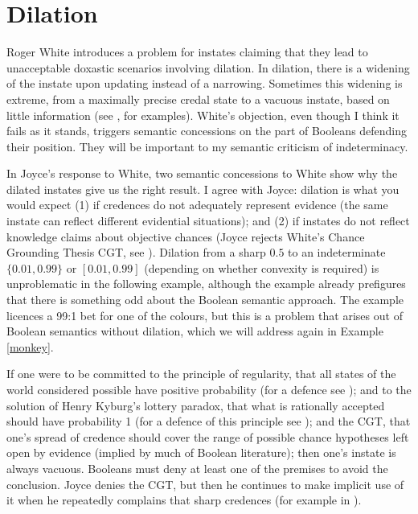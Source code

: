 \documentclass[11pt]{article}
\begin{document}
\section{Dilation}
\label{Dilation}

Roger White introduces a problem for instates claiming that they lead
to unacceptable doxastic scenarios involving dilation. In dilation,
there is a widening of the instate upon updating instead of a
narrowing. Sometimes this widening is extreme, from a maximally
precise credal state to a vacuous instate, based on little information
(see , for examples). White's objection, even
though I think it fails as it stands, triggers semantic concessions on
the part of Booleans defending their position. They will be important
to my semantic criticism of indeterminacy.

In Joyce's response to White, two semantic concessions to White show
why the dilated instates give us the right result. I agree with Joyce:
dilation is what you would expect (1) if credences do not adequately
represent evidence (the same instate can reflect different evidential
situations); and (2) if instates do not reflect knowledge claims about
objective chances (Joyce rejects White's Chance Grounding Thesis CGT,
see ). Dilation from a sharp $0.5$ to an
indeterminate $\{0.01,0.99\}$ or $[0.01,0.99]$ (depending on whether
convexity is required) is unproblematic in the following example,
although the example already prefigures that there is something odd
about the Boolean semantic approach. The example licences a 99:1 bet
for one of the colours, but this is a problem that arises out of
Boolean semantics without dilation, which we will address again in
Example \ref{monkey}.

\addtocounter{expls}{1}


If one were to be committed to the principle of regularity, that all
states of the world considered possible have positive probability (for
a defence see ); and to the solution of
Henry Kyburg's lottery paradox, that what is rationally accepted
should have probability 1 (for a defence of this principle see
); and the CGT, that one's spread of
credence should cover the range of possible chance hypotheses left
open by evidence (implied by much of Boolean literature); then one's
instate is always vacuous. Booleans must deny at least one of the
premises to avoid the conclusion. Joyce denies the CGT, but then he
continues to make implicit use of it when he repeatedly complains that
sharp credences  (for example in
).
\end{document}
